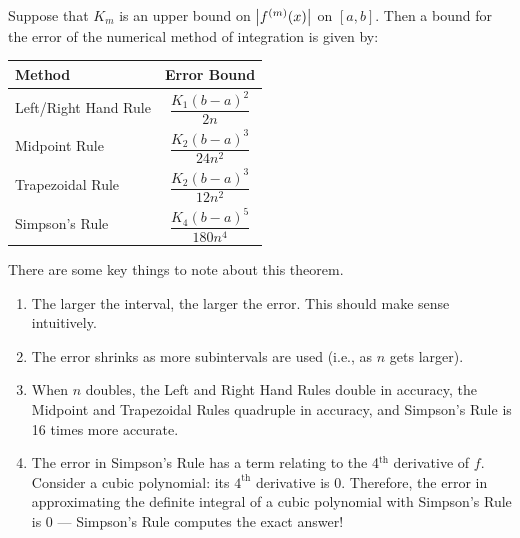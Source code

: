 \begin{theorem}\label{thm:numerical_error}%
Suppose that $K_m$ is an upper bound on $\left\lvert f^{(m)}(x) \right\rvert$ on $[a,b]$.  Then a bound for the error of the numerical method of integration is given by:
\begin{center}
\begin{tabular}{lc}
Method & Error Bound \\\midrule
Left/Right Hand Rule & $\dfrac{K_1(b-a)^2}{2n}$ \\\addlinespace
Midpoint Rule & $\dfrac{K_2(b-a)^3}{24n^2}$ \\\addlinespace
Trapezoidal Rule & $\dfrac{K_2(b-a)^3}{12n^2}$ \\\addlinespace
Simpson's Rule & $\dfrac{K_4(b-a)^5}{180n^4}$
\end{tabular}
\end{center}
\end{theorem}

There are some key things to note about this theorem.
\begin{enumerate}
	\item	The larger the interval, the larger the error. This should make sense intuitively.
	\item	The error shrinks as more subintervals are used (i.e., as $n$ gets larger).
	\item	When $n$ doubles, the Left and Right Hand Rules double in accuracy, the Midpoint and Trapezoidal Rules quadruple in accuracy, and Simpson's Rule is 16 times more accurate.
	\item	The error in Simpson's Rule has a term relating to the 4$^{\text{th}}$ derivative of $f$. Consider a cubic polynomial: its $4^{\text{th}}$ derivative is 0. Therefore, the error in approximating the definite integral of a cubic polynomial with Simpson's Rule is 0 --- Simpson's Rule computes the exact answer!
\end{enumerate}

